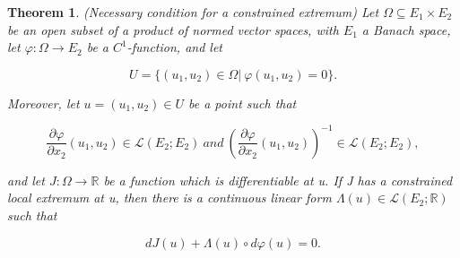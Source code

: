 \documentclass[a4paper]{report}
\newtheorem{theorem}{Theorem}[section]
\begin{document}
\begin{theorem}
    (Necessary condition for a constrained extremum\cite{gallier2019algebra}) Let $\Omega\subseteq E_1 \times E_2$ be an open subset of a product of normed vector spaces, with $E_1$ a Banach space, let $\varphi: \Omega\to E_2$ be a $C^1$-function, and let

    \[
        U=\{(u_1,u_2)\in \Omega |\ \varphi (u_1, u_2)=0\}.
    \]

    Moreover, let $u=(u_1,u_2)\in U$ be a point such that

    \[
        \frac{\partial \varphi}{\partial x_2}(u_1,u_2)\in \mathcal L (E_2;E_2)\ and\ \left(\frac{\partial \varphi}{\partial x_2}(u_1,u_2)\right)^{-1}\in \mathcal L (E_2;E_2),
    \]

    and let $J : \Omega \to \mathbb R $ be a function which is differentiable at u. If J has a constrained local extremum at u, then there is a continuous linear form $\Lambda(u)\in\mathcal L (E_2;\mathbb R)$ such that

    \[
        dJ(u)+\Lambda(u)\circ d\varphi(u)=0.
    \]

\end{theorem}
\end{document}
